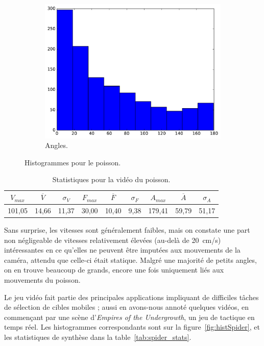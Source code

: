 \begin{figure}[!htbp]
\begin{subfigure}[t]{\subImgWclicks}
			\centering
			\includegraphics[width=\textwidth]{figures/ch3/poisson_angle}
			\caption{Angles.}
			\label{fig:poisson_angle}
		\end{subfigure}
		\caption[Histogrammes pour le poisson]{Histogrammes pour le poisson.}
		\label{fig:histPoisson}
	\end{figure}
	
\begin{table}
	\centering
	\begin{tabular}{c c c c c c c c c}
		$V_{max}$	& $\overline{V}$	& $\sigma_{V}$	& $F_{max}$	& $\overline{F}$	& $\sigma_{F}$	& $A_{max}$	& $\overline{A}$	& $\sigma_{A}$	\bigstrut[b] \\ \hline

		101,05		& 14,66				& 11,37			& 30,00		& 10,40				& 9,38			& 179,41	& 59,79				& 51,17			\bigstrut[t] \\
	\end{tabular}
	\caption[Statistiques pour la vidéo du poisson]{Statistiques pour la vidéo du poisson.}
	\label{tab:poisson_stats}
\end{table}

	Sans surprise, les vitesses sont généralement faibles, mais on constate une part non négligeable de vitesses relativement élevées (au-delà de 20~cm/s) intéressantes en ce qu'elles ne peuvent être imputées aux mouvements de la caméra, attendu que celle-ci était statique. Malgré une majorité de petits angles, on en trouve beaucoup de grands, encore une fois uniquement liés aux mouvements du poisson.	
	
	Le jeu vidéo fait partie des principales applications impliquant de difficiles tâches de sélection de cibles mobiles ; aussi en avons-nous annoté quelques vidéos, en commençant par une scène d'\emph{Empires of the Undergrowth}, un jeu de tactique en temps réel. Les histogrammes correspondants sont sur la figure~\ref{fig:histSpider}, et les statistiques de synthèse dans la table~\ref{tab:spider_stats}.

